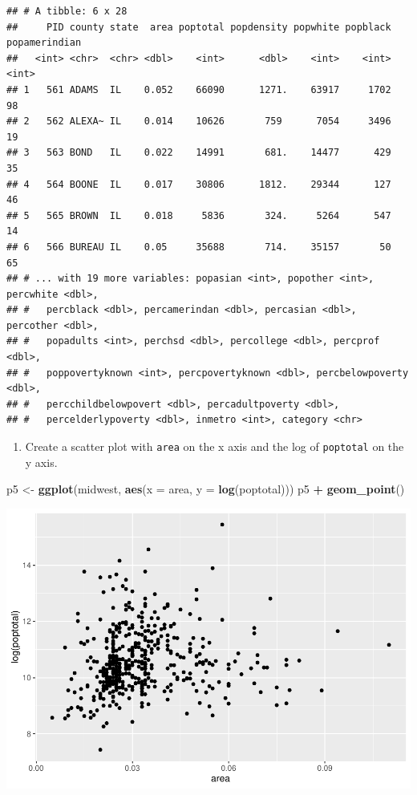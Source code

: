 \documentclass[
]{book}
\newenvironment{Shaded}{\begin{snugshade}}{\end{snugshade}}
\newcommand{\DataTypeTok}[1]{\textcolor[rgb]{0.13,0.29,0.53}{#1}}
\newcommand{\KeywordTok}[1]{\textcolor[rgb]{0.13,0.29,0.53}{\textbf{#1}}}
\newcommand{\NormalTok}[1]{#1}
\newcommand{\OperatorTok}[1]{\textcolor[rgb]{0.81,0.36,0.00}{\textbf{#1}}}
\newcommand{\StringTok}[1]{\textcolor[rgb]{0.31,0.60,0.02}{#1}}
\providecommand{\tightlist}{%
  \setlength{\itemsep}{0pt}\setlength{\parskip}{0pt}}
\begin{document}
\begin{verbatim}
## # A tibble: 6 x 28
##     PID county state  area poptotal popdensity popwhite popblack popamerindian
##   <int> <chr>  <chr> <dbl>    <int>      <dbl>    <int>    <int>         <int>
## 1   561 ADAMS  IL    0.052    66090      1271.    63917     1702            98
## 2   562 ALEXA~ IL    0.014    10626       759      7054     3496            19
## 3   563 BOND   IL    0.022    14991       681.    14477      429            35
## 4   564 BOONE  IL    0.017    30806      1812.    29344      127            46
## 5   565 BROWN  IL    0.018     5836       324.     5264      547            14
## 6   566 BUREAU IL    0.05     35688       714.    35157       50            65
## # ... with 19 more variables: popasian <int>, popother <int>, percwhite <dbl>,
## #   percblack <dbl>, percamerindan <dbl>, percasian <dbl>, percother <dbl>,
## #   popadults <int>, perchsd <dbl>, percollege <dbl>, percprof <dbl>,
## #   poppovertyknown <int>, percpovertyknown <dbl>, percbelowpoverty <dbl>,
## #   percchildbelowpovert <dbl>, percadultpoverty <dbl>,
## #   percelderlypoverty <dbl>, inmetro <int>, category <chr>
\end{verbatim}

\begin{enumerate}
\def\labelenumi{\arabic{enumi}.}
\tightlist
\item
  Create a scatter plot with \texttt{area} on the x axis and the log of \texttt{poptotal} on the y axis.
\end{enumerate}

\begin{Shaded}
\begin{Highlighting}[]
\NormalTok{p5 \textless{}{-}}\StringTok{ }\KeywordTok{ggplot}\NormalTok{(midwest, }\KeywordTok{aes}\NormalTok{(}\DataTypeTok{x =}\NormalTok{ area, }\DataTypeTok{y =} \KeywordTok{log}\NormalTok{(poptotal))) }
\NormalTok{p5 }\OperatorTok{+}\StringTok{ }\KeywordTok{geom\_point}\NormalTok{() }
\end{Highlighting}
\end{Shaded}

\includegraphics{R/Rgraphics/figures/unnamed-chunk-228-1.pdf}
\end{document}
